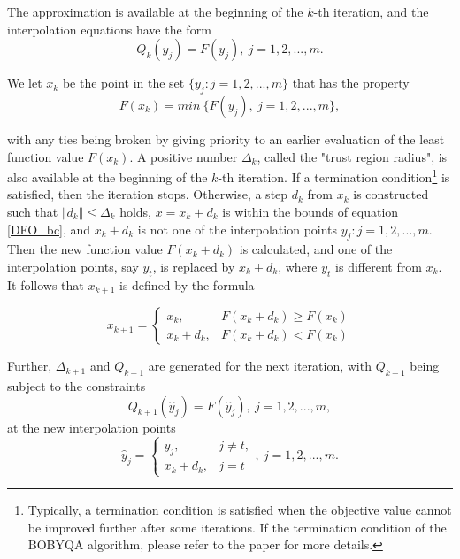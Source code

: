 \documentclass  [
  paper    = a4,
  BCOR     = 10mm,
  twoside,
  fontsize = 12pt,
  fleqn,
  toc      = bibnumbered,
  toc      = listofnumbered,
  numbers  = noendperiod,
  headings = normal,
  listof   = leveldown,
  version  = 3.03
]                                       {scrreprt}
\newcommand{\<}{\langle}
\renewcommand{\>}{\rangle}
\begin{document}
The approximation is available at the beginning of the $k$-th iteration, and the interpolation equations have the form
\begin{equation}
	Q_k(y_j)= F(y_j),\   j = 1, 2, ..., m.
\end{equation}

We let $x_k$ be the point in the set $\{y_j : j = 1, 2, ... , m\}$ that has the property
\begin{equation}
	F(x_k)= min\ \{F(y_j), \  j = 1, 2, ..., m\}, 
\end{equation}

with any ties being broken by giving priority to an earlier evaluation of the least function value $F(x_k)$. A positive number $\Delta_k$, called the "trust region radius", is also available at the beginning of the $k$-th iteration. If a termination condition\footnote{Typically, a termination condition is satisfied when the objective value cannot be improved further after some iterations. If the termination condition of the BOBYQA algorithm, please refer to the paper \cite{MicPow09} for more details.} is satisfied, then the iteration stops. Otherwise, a step $d_k$ from $x_k$ is constructed such that $ \Vert d_k \Vert \leq \Delta_k $ holds, $x = x_k+d_k$ is within the bounds of equation \ref{DFO_bc}, and $x_k+d_k$ is not one of the interpolation points $y_j : j = 1, 2, ... , m$. Then the new function value $F(x_k+d_k)$ is calculated, and one of the interpolation points, say $y_t$, is replaced by $x_k+d_k$, where $y_t$ is different from $x_k$. It follows that $x_{k+1}$ is defined by the formula

\begin{equation}
	x_{k+1} =
	\begin{cases}
		x_k, & F(x_k+d_k) \geq F(x_k) \\
		x_k+d_k  , & F(x_k+d_k) < F(x_k) 
	\end{cases}
\end{equation}

Further, $\Delta_{k+1}$ and $Q_{k+1}$ are generated for the next iteration, with $Q_{k+1}$ being subject to the constraints
\begin{equation}
	Q_{k+1}(\hat{y}_j)= F(\hat{y}_j), \  j = 1, 2, ..., m, 
\end{equation}
at the new interpolation points
\begin{equation}
	\hat{y}_j =
	\begin{cases}
		y_j, & j \neq t, \\
		x_k+d_k  , & j =t 
	\end{cases},  \  j = 1, 2, ..., m.
\end{equation}
\end{document}
